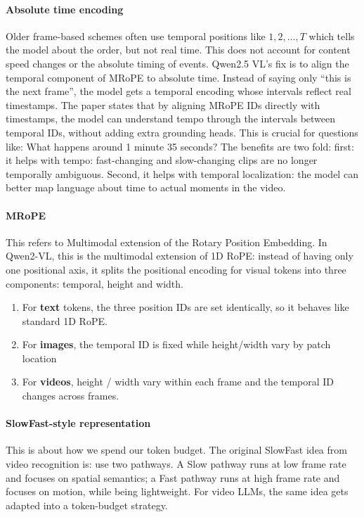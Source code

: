 \documentclass[11pt]{article}  %
\begin{document}
\paragraph{Absolute time encoding}
Older frame-based schemes often use temporal positions like $1, 2, \hdots, T$ which tells the model about the order, but not real time.
This does not account for content speed changes or the absolute timing of events.
Qwen2.5 VL's fix is to align the temporal component of MRoPE to absolute time.
Instead of saying only ``this is the next frame'', the model gets a temporal encoding whose intervals reflect real timestamps.
The paper states that by aligning MRoPE IDs directly with timestamps, the model can understand tempo through the intervals between temporal IDs, without adding extra grounding heads.
This is crucial for questions like: What happens around 1 minute 35 seconds?
The benefits are two fold: first: it helps with tempo: fast-changing and slow-changing clips are no longer temporally ambiguous. Second, it helps with temporal localization: the model can better map language about time to actual moments in the video.

\paragraph{MRoPE}
This refers to Multimodal extension of the Rotary Position Embedding.
In Qwen2-VL, this is the multimodal extension of 1D RoPE: instead of having only one positional axis, it splits the positional encoding for visual tokens into three components: temporal, height and width.

\begin{enumerate}
  \item For \textbf{text} tokens, the three position IDs are set identically, so it behaves like standard 1D RoPE.
  \item For \textbf{images}, the temporal ID is fixed while height/width vary by patch location
  \item For \textbf{videos}, height / width vary within each frame and the temporal ID changes across frames.
\end{enumerate}


\paragraph{SlowFast-style representation}
This is about how we spend our token budget.
The original SlowFast idea from video recognition is: use two pathways.
A Slow pathway runs at low frame rate and focuses on spatial semantics; a Fast pathway runs at high frame rate and focuses on motion, while being lightweight.
For video LLMs, the same idea gets adapted into a token-budget strategy.
\end{document}
